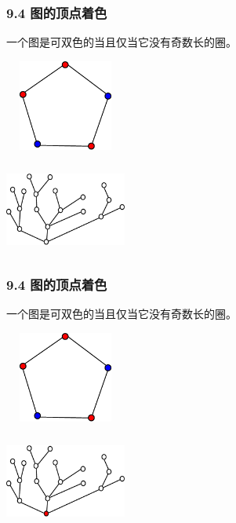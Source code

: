 \documentclass{beamer}
\begin{document}
\begin{CJK}{UTF8}{gbsn}
\begin{frame}
  \frametitle{9.4 图的顶点着色}
  \begin{theorem9.4.1}
    一个图是可双色的当且仅当它没有奇数长的圈。
  \end{theorem9.4.1}
\vspace{1cm}
  \begin{minipage}{0.45\linewidth}
\includegraphics[width=4cm,height=3cm]{pentagon5}    
  \end{minipage}
  \begin{minipage}{0.45\linewidth}
    \includegraphics[width=4cm,height=3cm]{color2}
  \end{minipage}
\end{frame}
\begin{frame}
  \frametitle{9.4 图的顶点着色}
  \begin{theorem9.4.1}
    一个图是可双色的当且仅当它没有奇数长的圈。
  \end{theorem9.4.1}
\vspace{1cm}
  \begin{minipage}{0.45\linewidth}
\includegraphics[width=4cm,height=3cm]{pentagon5}    
  \end{minipage}
  \begin{minipage}{0.45\linewidth}
    \includegraphics[width=4cm,height=3cm]{color21}
  \end{minipage}
\end{frame}


\end{CJK}
\end{document}
